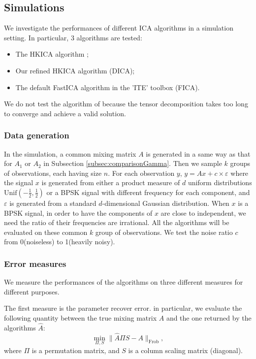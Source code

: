 \documentclass[twoside]{article}
\theoremstyle{definition}
\newcommand{\eps}{\varepsilon}
\begin{document}
\subsection{Simulations}
We investigate the performances of different ICA algorithms in a simulation setting. In particular, 3 algorithms are tested: 
\begin{itemize}
\item The HKICA algorithm \citep{hsu2013learning};
\item Our refined HKICA algorithm (DICA);
\item The default FastICA algorithm in the 'ITE' toolbox \cite{szabo12separation} (FICA). 
\end{itemize}
We do not test the algorithm of \citep{anandkumar2012tensordecomposition} because the tensor decomposition takes too long to converge and achieve a valid solution. 
\subsubsection{Data generation}
In the simulation, a common mixing matrix $A$ is generated in a same way as that for $A_1$ or $A_2$ in Subsection \ref{subsec:comparisonGamma}. 
Then we sample $k$ groups of observations, each having size $n$. 
For each observation $y$, $y = Ax+ c\times\eps$ where the signal $x$ is generated from either a product measure of $d$ uniform distributions $\text{Unif}(-\frac12, \frac12)$ or a BPSK signal with different frequency for each component, and $\eps$ is generated from a standard $d$-dimensional Gaussian distribution. 
When $x$ is a BPSK signal, in order to have the components of $x$ are close to independent, we need the ratio of their frequencies are irrational.
All the algorithms will be evaluated on these common $k$ group of observations.
We test the noise ratio $c$ from 0(noiseless) to 1(heavily noisy). 
\subsubsection{Error measures}
We measure the performances of the algorithms on three different measures for different purposes.

The first measure is the parameter recover error. in particular, we evaluate the following quantity between the true mixing matrix $A$ and the one returned by the algorithms $\widehat{A}$:
\begin{equation}
\label{equ:parerror}
\min_{\Pi,S} \|\widehat{A}\Pi S - A\|_{\text{Frob}},
\end{equation}
where $\Pi$ is a permutation matrix, and $S$ is a column scaling matrix (diagonal).
\end{document}
